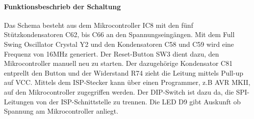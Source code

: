 \paragraph{Funktionsbeschrieb der Schaltung}\mbox{}

Das Schema besteht aus dem Mikrocontroller IC8 mit den fünf Stützkondensatoren C62, bis C66 an den Spannungseingängen. Mit dem Full Swing Oscillator Crystal Y2 und den Kondensatoren C58 und C59 wird eine Frequenz von 16MHz generiert. Der Reset-Button SW3 dient dazu, den Mikrocontroller manuell neu zu starten. Der dazugehörige Kondensator C81 entprellt den Button und der Widerstand R74 zieht die Leitung mittels Pull-up auf VCC. Mittels dem ISP-Stecker kann über einen Programmer, z.B AVR MKII, auf den Mikrocontroller zugegriffen werden. Der DIP-Switch ist dazu da, die SPI-Leitungen von der ISP-Schnittstelle zu trennen. Die LED D9 gibt Auskunft ob Spannung am Mikrocontroller anliegt.

